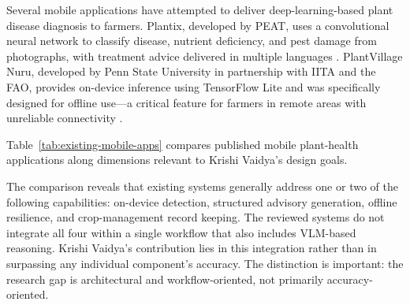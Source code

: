 
Several mobile applications have attempted to deliver deep-learning-based plant disease diagnosis
to farmers. Plantix, developed by PEAT, uses a convolutional neural network to classify disease,
nutrient deficiency, and pest damage from photographs, with treatment advice delivered in
multiple languages \parencite{petrellaPlantix2023}. PlantVillage Nuru, developed by Penn State
University in partnership with IITA and the FAO, provides on-device inference using TensorFlow
Lite and was specifically designed for offline use---a critical feature for farmers in remote
areas with unreliable connectivity \parencite{mrishoPlantVillageNuru2020}.

Table~\ref{tab:existing-mobile-apps} compares published mobile plant-health applications along
dimensions relevant to Krishi Vaidya's design goals.

\begin{table}[H]
\centering
\caption{Comparison of mobile plant-disease advisory systems}
\label{tab:existing-mobile-apps}
\small
{}
\end{table}

The comparison reveals that existing systems generally address one or two of the following
capabilities: on-device detection, structured advisory generation, offline resilience, and
crop-management record keeping. The reviewed systems do not integrate all four within a single
workflow that also includes VLM-based reasoning. Krishi Vaidya's
contribution lies in this integration rather than in surpassing any individual component's
accuracy. The distinction is important: the research gap is architectural and workflow-oriented,
not primarily accuracy-oriented.

